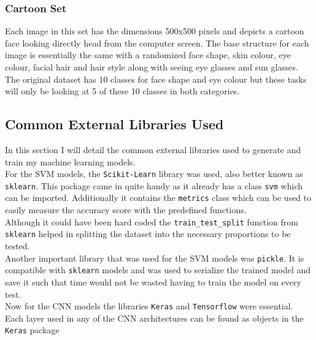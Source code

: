 \documentclass{article}
\begin{document}
	\subsubsection{Cartoon Set}
	Each image in this set has the dimensions 500x500 pixels and depicts a cartoon face looking directly head from the computer screen. The base structure for each image is essentially the same with a randomized face shape, skin colour, eye colour, facial hair and hair style along with seeing eye glasses and sun glasses. The original dataset has 10 classes for face shape and eye colour but these tasks will only be looking at 5 of these 10 classes in both categories.  
    \subsection{Common External Libraries Used}
    In this section I will detail the common external libraries used to generate and train my machine learning models.\\
    
    For the SVM models, the \verb|Scikit-Learn| library was used, also better known as \verb|sklearn|. This package came in quite handy as it already has a class \verb|svm| which can be imported. Additionally it contains the \verb|metrics| class which can be used to easily measure the accuracy score with the predefined functions.\\
    
    Although it could have been hard coded the \verb|train_test_split| function from \verb|sklearn| helped in splitting the dataset into the necessary proportions to be tested.\\
    
    Another important library that was used for the SVM models was \verb|pickle|. It is compatible with \verb|sklearn| models and was used to serialize the trained model and save it such that time would not be wasted having to train the model on every test.\\
    
    Now for the CNN models the libraries \verb|Keras| and \verb|Tensorflow| were essential. Each layer used in any of the CNN architectures can be found as objects in the \verb|Keras| package
\end{document}
